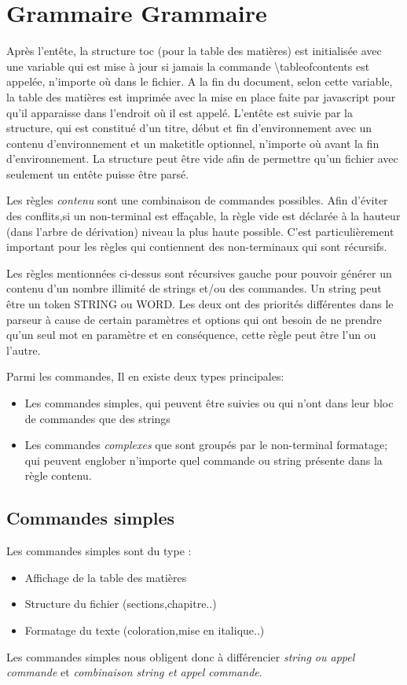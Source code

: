 \documentclass{report}
\begin{document}
\section{Grammaire Grammaire}{
Après l'entête, la structure toc (pour la table des matières) est initialisée avec une variable qui est mise à jour si jamais la commande \textbackslash tableofcontents est appelée, n'importe où dans le fichier. A la fin du document, selon cette variable, la table des matières est imprimée avec la mise en place faite par javascript pour qu'il apparaisse dans l'endroit où il est appelé. L'entête est suivie par la structure, qui est constitué d'un titre, début et fin d'environnement avec un contenu d'environnement et un maketitle optionnel, n'importe où avant la fin d'environnement. La structure peut être vide afin de permettre  qu'un fichier avec seulement un entête puisse être parsé. 

Les règles \textit{contenu} sont une combinaison de commandes possibles. Afin d'éviter des conflits,si un non-terminal est effaçable, la règle vide est déclarée à la hauteur (dans l'arbre de dérivation) niveau la plus haute possible. C'est particulièrement important pour les règles qui contiennent des non-terminaux qui sont récursifs.

 Les règles mentionnées ci-dessus sont récursives gauche pour pouvoir générer un contenu d'un nombre illimité de strings et/ou des commandes. Un string peut être un token STRING ou WORD. Les deux ont des priorités différentes dans le parseur à cause de certain paramètres et options qui ont besoin de ne prendre qu'un seul mot en paramètre et en conséquence, cette règle peut être l'un ou l'autre.

Parmi les commandes, Il en existe deux types principales: 
\begin{itemize}
\item Les commandes simples, qui peuvent être suivies ou qui n'ont dans leur bloc de commandes que des strings 
\item Les commandes \textit{complexes} que sont groupés par le non-terminal formatage; qui peuvent englober n'importe quel commande ou string présente dans la règle contenu.
\end{itemize}
\subsection{Commandes simples}{
Les commandes simples sont du type :
 \begin{itemize}
 \item Affichage de la table des matières
 \item Structure du fichier (sections,chapitre..)
 \item Formatage du texte (coloration,mise en italique..)
\end{itemize} 
Les commandes simples nous obligent donc à différencier
 \textit{string ou appel commande} et 
 \textit{combinaison string et appel commande}.
}}
\end{document}
